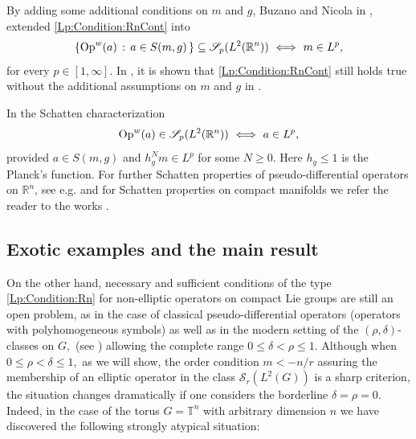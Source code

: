 \documentclass[12pt, reqno]{amsart}
\theoremstyle{definition}
\theoremstyle{remark}
\numberwithin{equation}{section}
\begin{document}
\par

By adding some additional conditions on $m$ and $g$,
Buzano and Nicola in \cite{BuzanoNicola2004}, extended \eqref{Lp:Condition:RnCont} into
\begin{equation}\label{Lp:Condition:Rn}
\{ \textnormal{Op}^{w}(a) \, : \, a\in S(m,g)\, \} \subseteq
\mathscr{S}_{p}(L^2(\mathbb{R}^n))
\ \Longleftrightarrow \ 
m \in L^p ,
\end{equation}
for every $p\in [1,\infty]$. In \cite{Toft2006}, it is shown that
\eqref{Lp:Condition:RnCont} still holds true without the
additional assumptions on $m$ and $g$ in \cite{BuzanoNicola2004}.

\par

In \cite{BuzanoToft2010} the Schatten characterization
\begin{equation}\label{Lp:Condition:RnContII}
\textnormal{Op}^{w}(a) \in
\mathscr{S}_{p}(L^2(\mathbb{R}^n))
\ \Longleftrightarrow \ 
a \in L^p ,
\end{equation}
provided $a\in S(m,g)$ and $h_g^Nm\in L^p$ for some
$N\ge 0$. Here $h_g\le 1$ is the Planck's function.
For further Schatten properties of pseudo-differential operators
on $\mathbb R^n$, see e.g.
\cite{Robert1978,Daubechis1980,GrochenigHeil,
Simon1992,Sjostrand1994,Toft2007,Toft2019} and for Schatten properties on compact manifolds we refer the reader to the works \cite{Delgado2013,DelgadoRuzhansky2014,DelRuzTrace1111,DelRuzTrace111,Delgado2015,DelgadoRuzhanskyWang,DelgadoRuzhanskyWang2,DelgadoRuzhanskyTokmagambetov2017,DelRuzTrace11,DelgadoRuzhansky2018MS,DelRuzTrace1,ChatzakouDelgadoRuzhansky2021,DelgadoRuzhansky2021,Delgado2022,ChatzakouDelgadoRuzhansky2022,Chatzakou2022,CardonaKumar2021,CardonaDelCorral2020,CardonaDelCorral2020K,CardonaKumar2019,Cardona2019,CardonaDelgadoRuzhanksyLOcalWeyl,CardonaDelgadoRuzhansky2022}.

\subsection{Exotic examples and the main result}
On the other hand, necessary and sufficient conditions of the type \eqref{Lp:Condition:Rn} for non-elliptic operators on compact Lie groups are still  an open problem, as in the case of classical pseudo-differential operators (operators with polyhomogeneous symbols) as well as in the modern setting of the $(\rho,\delta)$-classes on $G,$ (see \cite{Ruz}) allowing the complete range $0\leq \delta<\rho\leq 1.$ Although when $0\leq \rho<\delta\leq 1,$ as we will show, the order condition $m<-n/r$  assuring the membership of an elliptic operator in the class $\mathscr{S}_r(L^2(G))$ is a sharp criterion, the situation changes dramatically  if one considers the borderline $\delta=\rho=0.$ Indeed, in the case of the torus $G=\mathbb{T}^n$ with arbitrary dimension $n$ we have discovered the following strongly atypical situation:
\\
\end{document}
